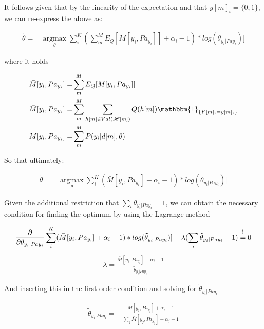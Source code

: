\documentclass[11pt]{article}
\begin{document}
\begin{article}
It follows given that by the linearity of the expectation and that
\(y[m]_i = \{0,1\}\), we can re-express the above as:

\begin{align} \label{eq:solution1}
\tilde{\theta} =& \operatorname*{argmax}_{\theta} \sum_i^K (\sum_m^M E_Q[M[y_i, Pa_{y_i}]] + \alpha_i - 1) * log(\theta_{y_i | Pa{y_i}})] 
\end{align}

where it holds

\begin{align} \label{eq:expected_sufficient}
\bar{M}[y_i, Pa_{y_i}]  =& \sum_m^M E_Q[M[y_i, Pa_{y_i}]]\\
\bar{M}[y_i, Pa_{y_i}]  =& \sum_m^M \sum_{h[m] \in Val(\mathscr{H}[m])} Q(h[m]) \mathbbm{1}_{\{Y[m]_i = y[m]_i\}}\\
\bar{M}[y_i, Pa_{y_i}]  =& \sum_m^M P(y_i | d[m], \theta)
\end{align}

So that ultimately:

\begin{align} \label{eq:solution2}
\tilde{\theta} =& \operatorname*{argmax}_{\theta} \sum_i^K (\bar{M}[y_i, Pa_{y_i}] + \alpha_i - 1) * log(\theta_{y_i | Pa{y_i}})] 
\end{align}

Given the additional restriction that \(\sum_i \theta_{y_i |
    Pa{y_i}} = 1\), we can obtain the necessary condition for finding
the optimum by using the Lagrange method

\begin{align} \label{eq:first-order1}
\frac{\partial}{\partial \theta_{y_i | Pa{y_i}}} \sum_i^K (\bar{M}[y_i, Pa_{y_i}] + \alpha_i - 1) * log(\tilde{\theta}_{y_i | Pa{y_i}})] - \lambda (\sum_i \tilde{\theta}_{y_i | Pa{y_i}} - 1) \mathrel{\stackon[5pt]{$=$}{$\scriptstyle!$}} 0
\end{align}
\begin{align} \label{eq:first-order2}
\lambda = \frac{\bar{M}[y_i, Pa_{y_i}] + \alpha_i - 1}{\tilde{\theta}_{y_i | Pa{y_i}}}
\end{align}

And inserting this in the first order condition and solving for
\(\tilde{\theta}_{y_i | Pa{y_i}}\)

\begin{align} \label{eq:solution}
\tilde{\theta}_{y_i | Pa{y_i}} =& \frac{\bar{M}[y_i, Pa_{y_i}] + \alpha_i - 1}{\sum_j \bar{M}[y_j, Pa_{y_j}] + \alpha_j - 1}
\end{align}


\end{article}
\end{document}
